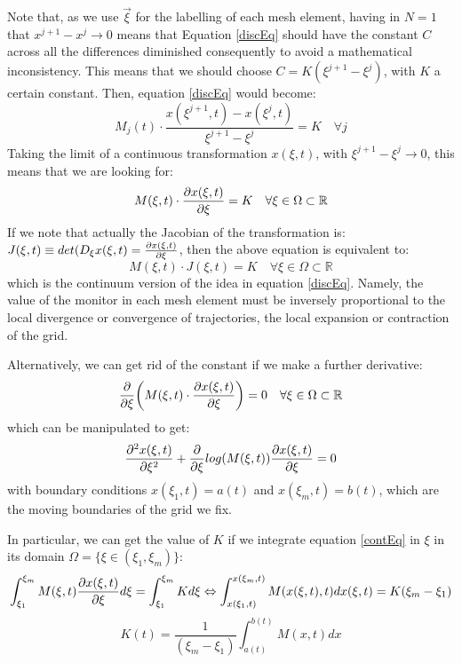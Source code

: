 \documentclass[11pt, a4paper]{article} %
\newcommand{\R}{\mathbb{R}} %
\begin{document}
Note that, as we use $\vec{\xi}$ for the labelling of each mesh element, having in $N=1$ that $x^{j+1}-x^j\rightarrow 0$ means that Equation \eqref{discEq} should have the constant $C$ across all the differences diminished consequently to avoid a mathematical inconsistency. This means that we should choose $C=K(\xi^{j+1}-\xi^j)$, with $K$ a certain constant. Then, equation \eqref{discEq} would become:
\begin{equation}
M_j(t)\cdot \frac{x(\xi^{j+1},t)-x(\xi^{j},t)}{\xi^{j+1}-\xi^j}=K \quad \forall j
\end{equation}
Taking the limit of a continuous transformation $x(\xi,t)$, with $\xi^{j+1}-\xi^j\rightarrow 0$, this means that we are looking for:
\begin{equation}\label{contEq}
M(\xi,t)\cdot \pdv{x(\xi,t)}{\xi}=K \quad \forall \xi\in \Omega\subset \R
\end{equation}
If we note that actually the Jacobian of the transformation is: $J(\xi,t)\equiv det(D_{\xi}x(\xi,t)=\pdv{x(\xi,t)}{\xi}$, then the above equation is equivalent to:
\begin{equation}
M(\xi,t)\cdot J(\xi,t)=K \quad \forall \xi\in \Omega\subset \R
\end{equation}
which is the continuum version of the idea in equation \eqref{discEq}. Namely, the value of the monitor in each mesh element must be inversely proportional to the local divergence or convergence of trajectories, the local expansion or contraction of the grid.

Alternatively, we can get rid of the constant if we make a further derivative:
\begin{equation}\label{EL1D}
\pdv{}{\xi}\qty(M(\xi,t)\cdot \pdv{x(\xi,t)}{\xi})=0 \quad \forall \xi\in \Omega\subset \R
\end{equation}
which can be manipulated to get:
\begin{equation}
\pdv[2]{x(\xi,t)}{\xi}+\pdv{}{\xi}log(M(\xi,t))\pdv{x(\xi,t)}{\xi}=0
\end{equation}
with boundary conditions $x(\xi_1,t)=a(t)$ and $x(\xi_m,t)=b(t)$, which are the moving boundaries of the grid we fix.

In particular, we can get the value of $K$ if we integrate equation \eqref{contEq} in $\xi$ in its domain $\Omega=\{\xi\in(\xi_1,\xi_m)\}$:
\begin{equation}
\int^{\xi_m}_{\xi_1} M(\xi,t) \pdv{x(\xi,t)}{\xi} d\xi=\int^{\xi_m}_{\xi_1} K d \xi  \Leftrightarrow \int^{x(\xi_m,t)}_{x(\xi_1,t)} M(x(\xi,t),t) dx(\xi,t)=K(\xi_m-\xi_1)
\end{equation}
\begin{equation}
K(t)=\frac{1}{(\xi_m-\xi_1)}\int^{b(t)}_{a(t)} M(x,t) dx
\end{equation}
\end{document}
